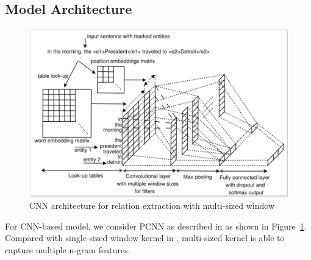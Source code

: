 \documentclass[a4paper]{article}
\begin{document}
\begin{spacing}{1.0}
  \subsection{Model Architecture}
  \begin{figure}
    \centering
    \includegraphics[width=\linewidth]{cnn_multi_window}
    \caption{CNN architecture for relation extraction with multi-sized window \cite{pcnn}}
    \label{fig:cnn_multi_window}
  \end{figure}
  For CNN-based model, we consider PCNN as described in \cite{pcnn} as shown in Figure~\ref{fig:cnn_multi_window}. Compared with single-sized window kernel in \cite{re_cnn}, multi-sized kernel is able to capture multiple n-gram features.
  

\end{spacing}
\end{document}
